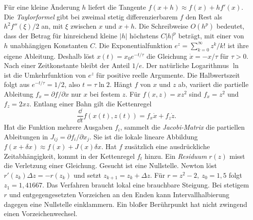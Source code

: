 Für eine kleine Änderung \(h\) liefert die Tangente \(f(x+h)\approx f(x)+hf'(x)\). Die \emph{Taylorformel} gibt bei zweimal stetig differenzierbarem \(f\) den Rest als \(h^2 f''(\xi)/2\) an, mit \(\xi\) zwischen \(x\) und \(x+h\). Die Schreibweise \(O(h^p)\) bedeutet, dass der Betrag für hinreichend kleine \(|h|\) höchstens \(C|h|^p\) beträgt, mit einer von \(h\) unabhängigen Konstanten \(C\).
Die Exponentialfunktion \(e^z=\sum_{k=0}^\infty z^k/k!\) ist ihre eigene Ableitung. Deshalb löst \(x(t)=x_0e^{-t/\tau}\) die Gleichung \(\dot x=-x/\tau\) für \(\tau>0\). Nach einer Zeitkonstante bleibt der Anteil \(1/e\). Der natürliche Logarithmus \(\ln\) ist die Umkehrfunktion von \(e^z\) für positive reelle Argumente. Die Halbwertszeit folgt aus \(e^{-t/\tau}=1/2\), also \(t=\tau\ln 2\).
Hängt \(f\) von \(x\) und \(z\) ab, variiert die partielle Ableitung \(f_x=\partial f/\partial x\) nur \(x\) bei festem \(z\). Für \(f(x,z)=xz^2\) sind \(f_x=z^2\) und \(f_z=2xz\). Entlang einer Bahn gilt die Kettenregel
\[
 \frac{\dd}{\dd t}f(x(t),z(t))=f_x\dot x+f_z\dot z .
\]
Hat die Funktion mehrere Ausgaben \(f_i\), sammelt die \emph{Jacobi-Matrix} die partiellen Ableitungen in \(J_{ij}=\partial f_i/\partial x_j\). Sie ist die lokale lineare Abbildung \(f(x+\delta x)\approx f(x)+J(x)\delta x\). Hat \(f\) zusätzlich eine ausdrückliche Zeitabhängigkeit, kommt in der Kettenregel \(f_t\) hinzu.
Ein \emph{Residuum} \(r(z)\) misst die Verletzung einer Gleichung. Gesucht ist eine Nullstelle. Newton löst \(r'(z_k)\Delta z=-r(z_k)\) und setzt \(z_{k+1}=z_k+\Delta z\). Für \(r=z^2-2,\ z_0=1{,}5\) folgt \(z_1=1{,}41667\). Das Verfahren braucht lokal eine brauchbare Steigung. Bei stetigem \(r\) und entgegengesetzten Vorzeichen an den Enden kann Intervallhalbierung dagegen eine Nullstelle einklammern. Ein bloßer Berührpunkt hat nicht zwingend einen Vorzeichenwechsel.



